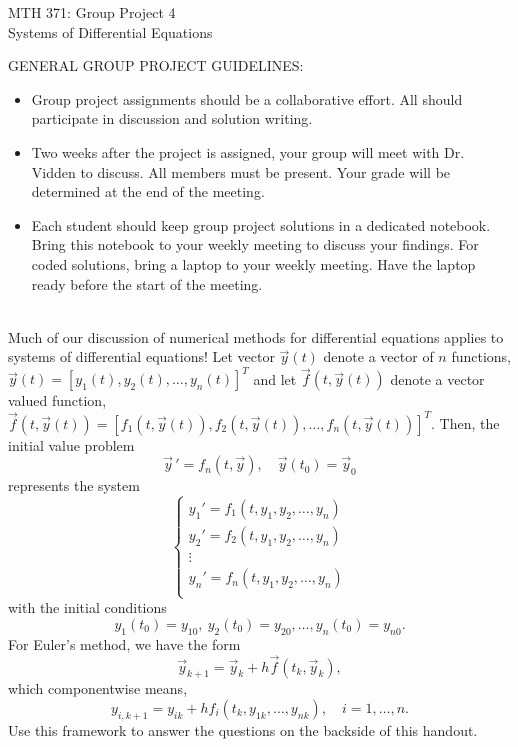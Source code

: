 \documentclass[addpoints, 11pt]{exam}
\begin{document}
\vspace{100mm}
\begin{center} \Large
MTH 371: Group Project 4 \\ Systems of Differential Equations \normalsize
\end{center}

\noindent GENERAL GROUP PROJECT GUIDELINES: 
\begin{itemize}
\item Group project assignments should be a collaborative effort. All should participate in discussion and solution writing. \vspace{-2mm}
\item Two weeks after the project is assigned, your group will meet with Dr. Vidden to discuss. All members must be present. Your grade will be determined at the end of the meeting. \vspace{-2mm}
\item Each student should keep group project solutions in a dedicated notebook. Bring this notebook to your weekly meeting to discuss your findings. For coded solutions, bring a laptop to your weekly meeting. Have the laptop ready before the start of the meeting. \vspace{-2mm}
\end{itemize}
\ \\

\noindent Much of our discussion of numerical methods for differential equations applies to systems of differential equations! Let vector $\vec{y}(t)$ denote a vector of $n$ functions, $\vec{y}(t) = [ y_1(t), y_2(t), \dots, y_n(t) ]^T$ and let $\vec{f}(t,\vec{y}(t))$ denote a vector valued function, $\vec{f}(t,\vec{y}(t))=[f_1(t,\vec{y}(t)), f_2(t,\vec{y}(t)), \dots, f_n(t,\vec{y}(t))]^T$. Then, the initial value problem
$$
\vec{y}\,' = f_n\left(t,\vec{y}\right), \quad \vec{y}(t_0) = \vec{y}_0
$$
represents the system
$$
\begin{cases}
y_1' = f_1(t,y_1,y_2, \dots, y_n) \\
y_2' = f_2(t,y_1,y_2, \dots, y_n) \\
\vdots \\
y_n' = f_n(t,y_1,y_2, \dots, y_n) \\
\end{cases}
$$
with the initial conditions
$$
y_1(t_0)=y_{10}, \ y_2(t_0)=y_{20}, \dots, y_n(t_0)=y_{n0}.
$$
For Euler's method, we have the form
$$
\vec{y}_{k+1} = \vec{y}_k + h \vec{f}(t_k,\vec{y}_k),
$$
which componentwise means,
$$
y_{i,k+1} = y_{ik} + h f_i(t_k,y_{1k},\dots,y_{nk}), \quad i=1,\dots,n.
$$
Use this framework to answer the questions on the backside of this handout.
\pagebreak
\end{document}
